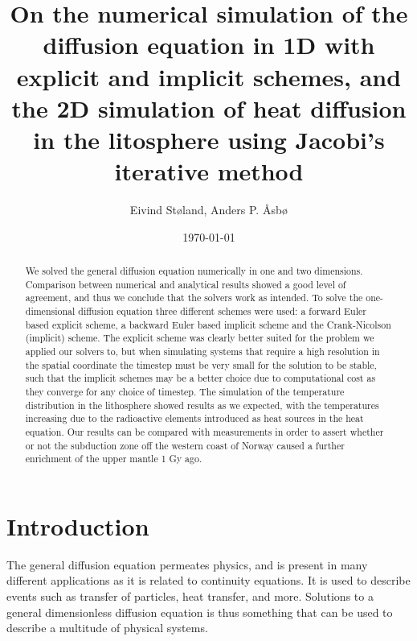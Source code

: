 \documentclass[reprint,english,notitlepage]{revtex4-1}  %
\begin{document}
\title{On the numerical simulation of the diffusion equation in 1D with explicit and implicit schemes, and the 2D simulation of heat diffusion in the litosphere using Jacobi's iterative method}   %
\author{Eivind Støland, Anders P. Åsbø}               %
\date{\today}                             %
\noaffiliation                            %

\begin{abstract}
We solved the general diffusion equation numerically in one and two dimensions. Comparison between numerical and analytical results showed a good level of agreement, and thus we conclude that the solvers work as intended. To solve the one-dimensional diffusion equation three different schemes were used: a forward Euler based explicit scheme, a backward Euler based implicit scheme and the Crank-Nicolson (implicit) scheme. The explicit scheme was clearly better suited for the problem we applied our solvers to, but when simulating systems that require a high resolution in the spatial coordinate the timestep must be very small for the solution to be stable, such that the implicit schemes may be a better choice due to computational cost as they converge for any choice of timestep. The simulation of the temperature distribution in the lithosphere showed results as we expected, with the temperatures increasing due to the radioactive elements introduced as heat sources in the heat equation. Our results can be compared with measurements in order to assert whether or not the subduction zone off the western coast of Norway caused a further enrichment of the upper mantle 1 Gy ago.
\end{abstract}

\maketitle                                %


\tableofcontents

\section{Introduction} \label{sec:introduction}

The general diffusion equation permeates physics, and is present in many different applications as it is related to continuity equations. It is used to describe events such as transfer of particles, heat transfer, and more. Solutions to a general dimensionless diffusion equation is thus something that can be used to describe a multitude of physical systems. 
\end{document}
